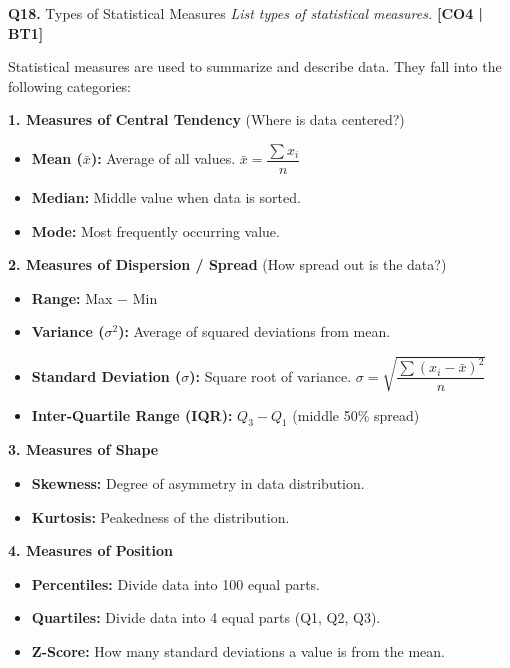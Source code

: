 \documentclass[12pt,a4paper]{article}
\newcommand{\Qno}[1]{\textbf{\color{darkred}Q#1.}}
\newcommand{\term}[1]{\textbf{\color{headingcolor}#1}}
\begin{document}
\vspace{8pt}

\begin{questionbox}{\Qno{18} Types of Statistical Measures}
\textit{List types of statistical measures.} \hfill \textbf{[CO4 | BT1]}
\end{questionbox}

\begin{answerenv}

Statistical measures are used to summarize and describe data. They fall into the following categories:

\vspace{6pt}
\textbf{\color{headingcolor}1. Measures of Central Tendency} (Where is data centered?)
\begin{itemize}[leftmargin=1.5em, itemsep=2pt]
  \item \term{Mean ($\bar{x}$):} Average of all values. $\bar{x} = \dfrac{\sum x_i}{n}$
  \item \term{Median:} Middle value when data is sorted.
  \item \term{Mode:} Most frequently occurring value.
\end{itemize}

\textbf{\color{headingcolor}2. Measures of Dispersion / Spread} (How spread out is the data?)
\begin{itemize}[leftmargin=1.5em, itemsep=2pt]
  \item \term{Range:} Max $-$ Min
  \item \term{Variance ($\sigma^2$):} Average of squared deviations from mean.
  \item \term{Standard Deviation ($\sigma$):} Square root of variance. $\sigma = \sqrt{\dfrac{\sum(x_i - \bar{x})^2}{n}}$
  \item \term{Inter-Quartile Range (IQR):} $Q_3 - Q_1$ (middle 50\% spread)
\end{itemize}

\textbf{\color{headingcolor}3. Measures of Shape}
\begin{itemize}[leftmargin=1.5em, itemsep=2pt]
  \item \term{Skewness:} Degree of asymmetry in data distribution.
  \item \term{Kurtosis:} Peakedness of the distribution.
\end{itemize}

\textbf{\color{headingcolor}4. Measures of Position}
\begin{itemize}[leftmargin=1.5em, itemsep=2pt]
  \item \term{Percentiles:} Divide data into 100 equal parts.
  \item \term{Quartiles:} Divide data into 4 equal parts (Q1, Q2, Q3).
  \item \term{Z-Score:} How many standard deviations a value is from the mean.
\end{itemize}

\end{answerenv}
\end{document}
